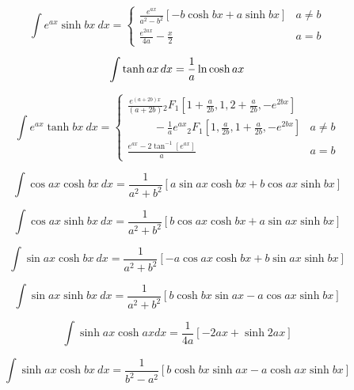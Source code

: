 \begin{equation}
\int e^{ax} \sinh bx \ dx =
\begin{cases}
\displaystyle{\frac{e^{ax}}{a^2-b^2} }[ -b \cosh bx + a \sinh bx ]  & a\ne b \\
\displaystyle{\frac{e^{2ax}}{4a} - \frac{x}{2}}  & a = b
\end{cases}
\end{equation}


\begin{equation}\label{eq:yates}
\int  \tanh ax\hspace{1.5pt} dx =\frac{1}{a} \ln \cosh ax 
\end{equation}

\begin{equation}\label{eq:dewitt}
\int  e^{ax} \tanh bx\ dx = 
\begin{cases}
\displaystyle{ \frac{ e^{(a+2b)x}}{(a+2b)} 
{_2F_1}\left[ 1+\frac{a}{2b},1,2+\frac{a}{2b}, -e^{2bx}\right] }& \\
\displaystyle{
\hspace{1cm}-\frac{1}{a}e^{ax}{_2F_1}\left[ 1, \frac{a}{2b},1+\frac{a}{2b}, -e^{2bx}\right]
}
 & a\ne b \\
\displaystyle{\frac{e^{ax}-2\tan^{-1}[e^{ax}]}{a} } & a = b
\end{cases}
\end{equation}



\begin{equation}
\int \cos ax \cosh bx\ dx = 
\frac{1}{a^2 + b^2} \left[
a \sin ax \cosh bx  + b \cos ax \sinh bx
\right] 
\end{equation}

\begin{equation}
\int \cos ax \sinh bx\ dx = 
\frac{1}{a^2 + b^2} \left[
b \cos ax \cosh bx +
 a \sin ax \sinh bx
\right] 
\end{equation}

\begin{equation}
\int \sin ax \cosh bx \ dx = 
\frac{1}{a^2 + b^2} \left[
-a \cos ax \cosh bx +
 b \sin ax \sinh bx
\right] 
\end{equation}

\begin{equation}
\int \sin ax \sinh bx \ dx = 
\frac{1}{a^2 + b^2} \left[
b \cosh bx \sin ax -
 a \cos ax \sinh bx
\right] 
\end{equation}

\begin{equation}
\int \sinh ax \cosh ax dx= 
\frac{1}{4a}\left[ 
-2ax + \sinh 2ax \right]
\end{equation}

\begin{equation}
\int \sinh ax \cosh bx \ dx = 
\frac{1}{b^2-a^2}\left[ 
b \cosh bx \sinh ax 
- a \cosh ax \sinh bx \right]
\end{equation}
